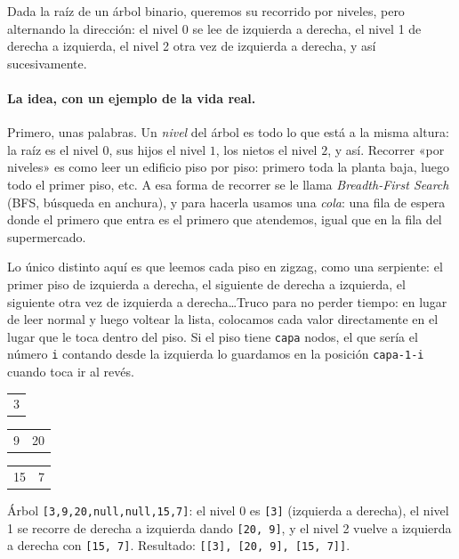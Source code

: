 
Dada la raíz de un árbol binario, queremos su recorrido por niveles, pero
alternando la dirección: el nivel 0 se lee de izquierda a derecha, el nivel 1
de derecha a izquierda, el nivel 2 otra vez de izquierda a derecha, y así
sucesivamente.

\paragraph{La idea, con un ejemplo de la vida real.} Primero, unas palabras.
Un \emph{nivel} del árbol es todo lo que está a la misma altura: la raíz es el
nivel $0$, sus hijos el nivel $1$, los nietos el nivel $2$, y así. Recorrer «por
niveles» es como leer un edificio piso por piso: primero toda la planta baja,
luego todo el primer piso, etc. A esa forma de recorrer se le llama \emph{Breadth-First
Search} (BFS, búsqueda en anchura), y para hacerla usamos una \emph{cola}: una fila de espera
donde el primero que entra es el primero que atendemos, igual que en la fila del
supermercado.

Lo único distinto aquí es que leemos cada piso en zigzag, como una serpiente:
el primer piso de izquierda a derecha, el siguiente de derecha a izquierda, el
siguiente otra vez de izquierda a derecha\ldots Truco para no perder tiempo: en
lugar de leer normal y luego voltear la lista, colocamos cada valor directamente
en el lugar que le toca dentro del piso. Si el piso tiene \texttt{capa} nodos, el
que sería el número \texttt{i} contando desde la izquierda lo guardamos en la
posición \texttt{capa-1-i} cuando toca ir al revés.

\begin{center}
\ttfamily
\begin{tabular}{c}
3\\
\end{tabular}
\quad
\begin{tabular}{cc}
9 & 20\\
\end{tabular}
\quad
\begin{tabular}{cc}
15 & 7\\
\end{tabular}
\end{center}

\noindent Árbol \texttt{[3,9,20,null,null,15,7]}: el nivel 0 es \texttt{[3]}
(izquierda a derecha), el nivel 1 se recorre de derecha a izquierda dando
\texttt{[20, 9]}, y el nivel 2 vuelve a izquierda a derecha con
\texttt{[15, 7]}. Resultado: \texttt{[[3], [20, 9], [15, 7]]}.

